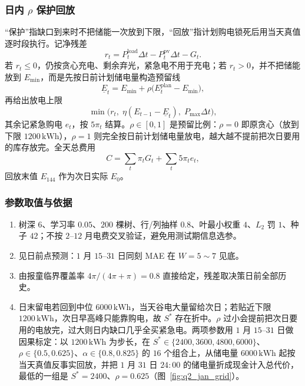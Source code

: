 \subsubsection{日内 $\rho$ 保护回放}

“保护”指缺口到来时不把储能一次放到下限，“回放”指计划购电锁死后用当天真值逐时段执行。记净残差
\begin{equation}
r_t=P^{\mathrm{load}}_{t}\Delta t-P^{\mathrm{pv}}_{t}\Delta t-G_t.
\label{eq:q2_resid}
\end{equation}
若 $r_t\le0$，仍按贪心充电、剩余弃光，紧急电不用于充电；若 $r_t>0$，并不把储能放到 $E_{\min}$，而是先按日前计划储电量构造预留线
\begin{equation}
\underline{E}_t=E_{\min}+\rho\bigl(E^{\mathrm{plan}}_{t}-E_{\min}\bigr),
\label{eq:q2_reserve}
\end{equation}
再给出放电上限
\begin{equation}
\min\bigl(r_t,\;\eta(E_{t-1}-\underline{E}_t),\;P_{\max}\Delta t\bigr),
\label{eq:q2_dmax}
\end{equation}
其余记紧急购电 $e_t$，按 $5\pi_t$ 结算。$\rho\in[0,1]$ 是预留比例：$\rho=0$ 即原贪心（放到下限 $1200\,\mathrm{kWh}$），$\rho=1$ 则完全按日前计划储电量放电，越大越不提前把次日要用的库存放完。全天总费用
\begin{equation}
C=\sum_{t}\pi_t G_t+\sum_{t}5\pi_t e_t,
\label{eq:q2_cost}
\end{equation}
回放末值 $E_{144}$ 作为次日实际 $E_0$。

\subsubsection{参数取值与依据}

\begin{enumerate}
  \item {}树深 $6$、学习率 $0.05$、$200$ 棵树、行/列抽样 $0.8$、叶最小权重 $4$、$L_2$ 罚 $1$、种子 $42$；不按 $2$--$12$ 月电费交叉验证，避免用测试期信息选参。
  \item {}见日前点预测：$1$ 月 $15$--$31$ 日同刻 MAE 在 $W=5\sim7$ 见底。
  \item {}由报童临界覆盖率 $4\pi/(4\pi+\pi)=0.8$ 直接给定，残差取决策日前全部历史。
  \item {}日末留电若回到中位 $6000\,\mathrm{kWh}$，当天谷电大量留给次日；若贴近下限 $1200\,\mathrm{kWh}$，次日早高峰只能靠购电，故 $S^{*}$ 存在折中。$\rho$ 过小会提前把次日要用的电放完，过大则日内缺口几乎全买紧急电。两项参数用 $1$ 月 $15$--$31$ 日做因果标定：以 $1200\,\mathrm{kWh}$ 为步长，在 $S^{*}\in\{2400,3600,4800,6000\}$、$\rho\in\{0.5,0.625\}$、$\alpha\in\{0.8,0.825\}$ 的 $16$ 个组合上，从储电量 $6000\,\mathrm{kWh}$ 起按当天真值反事实回放，并把 $1$ 月 $31$ 日 $24{:}00$ 的储电量折成现金计入总代价，最低的一组是 $S^{*}=2400$、$\rho=0.625$（图~\ref{fig:q2_jan_grid}）。
\end{enumerate}

